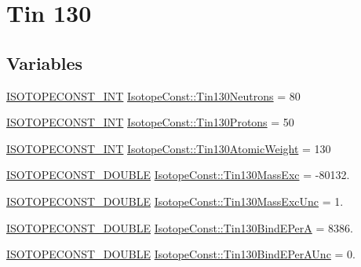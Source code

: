 \hypertarget{group___isotope_const-_tin-_sn130}{}\section{Tin 130}
\label{group___isotope_const-_tin-_sn130}
\subsection*{Variables}
\begin{DoxyCompactItemize}
\item 
\mbox{\hyperlink{group___isotope_const-_macros_ga5f18360b3e99483a35c32d789e62621c}{I\+S\+O\+T\+O\+P\+E\+C\+O\+N\+S\+T\+\_\+\+I\+NT}} \mbox{\hyperlink{group___isotope_const-_tin-_sn130_ga7c03b2dca6822d22df1137bea694f091}{Isotope\+Const\+::\+Tin130\+Neutrons}} = 80
\item 
\mbox{\hyperlink{group___isotope_const-_macros_ga5f18360b3e99483a35c32d789e62621c}{I\+S\+O\+T\+O\+P\+E\+C\+O\+N\+S\+T\+\_\+\+I\+NT}} \mbox{\hyperlink{group___isotope_const-_tin-_sn130_ga469b7ba869e45ab700295c472f1bff51}{Isotope\+Const\+::\+Tin130\+Protons}} = 50
\item 
\mbox{\hyperlink{group___isotope_const-_macros_ga5f18360b3e99483a35c32d789e62621c}{I\+S\+O\+T\+O\+P\+E\+C\+O\+N\+S\+T\+\_\+\+I\+NT}} \mbox{\hyperlink{group___isotope_const-_tin-_sn130_ga861a5021ad8d1208e00734cfc54468ff}{Isotope\+Const\+::\+Tin130\+Atomic\+Weight}} = 130
\item 
\mbox{\hyperlink{group___isotope_const-_macros_ga8f45a7272ce02c0b4c65c44636ed719a}{I\+S\+O\+T\+O\+P\+E\+C\+O\+N\+S\+T\+\_\+\+D\+O\+U\+B\+LE}} \mbox{\hyperlink{group___isotope_const-_tin-_sn130_ga47f64a26d383871e26047f2800381e5c}{Isotope\+Const\+::\+Tin130\+Mass\+Exc}} = -\/80132.
\item 
\mbox{\hyperlink{group___isotope_const-_macros_ga8f45a7272ce02c0b4c65c44636ed719a}{I\+S\+O\+T\+O\+P\+E\+C\+O\+N\+S\+T\+\_\+\+D\+O\+U\+B\+LE}} \mbox{\hyperlink{group___isotope_const-_tin-_sn130_ga0b9b244d73d6848ff864b52f8c159634}{Isotope\+Const\+::\+Tin130\+Mass\+Exc\+Unc}} = 1.
\item 
\mbox{\hyperlink{group___isotope_const-_macros_ga8f45a7272ce02c0b4c65c44636ed719a}{I\+S\+O\+T\+O\+P\+E\+C\+O\+N\+S\+T\+\_\+\+D\+O\+U\+B\+LE}} \mbox{\hyperlink{group___isotope_const-_tin-_sn130_ga14ea6ff1bcd52b1f2eb837e678f23b2e}{Isotope\+Const\+::\+Tin130\+Bind\+E\+PerA}} = 8386.
\item 
\mbox{\hyperlink{group___isotope_const-_macros_ga8f45a7272ce02c0b4c65c44636ed719a}{I\+S\+O\+T\+O\+P\+E\+C\+O\+N\+S\+T\+\_\+\+D\+O\+U\+B\+LE}} \mbox{\hyperlink{group___isotope_const-_tin-_sn130_gacfe6540e481c0c93eff45ba079bb5e5c}{Isotope\+Const\+::\+Tin130\+Bind\+E\+Per\+A\+Unc}} = 0.

\end{DoxyCompactItemize}

